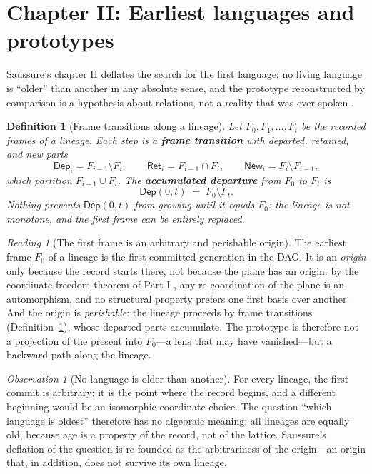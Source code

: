 \documentclass[11pt,a4paper]{article}
\newtheorem{definition}[principle]{Definition}
\theoremstyle{remark}
\newtheorem{observation}[principle]{Observation}
\newtheorem{reading}[principle]{Reading}
\newcommand{\Dep}{\ensuremath{\mathsf{Dep}}}             %
\newcommand{\Ret}{\ensuremath{\mathsf{Ret}}}             %
\newcommand{\New}{\ensuremath{\mathsf{New}}}             %
\begin{document}
\section{Chapter II: Earliest languages and prototypes}
\label{sec:ch2}

Saussure's chapter II deflates the search for the first language: no living
language is ``older'' than another in any absolute sense, and the prototype
reconstructed by comparison is a hypothesis about relations, not a reality
that was ever spoken \cite[Part V, ch.~II]{harris1983}.

\begin{definition}[Frame transitions along a lineage]
\label{def:frame-transition}
Let $F_0, F_1, \dots, F_t$ be the recorded frames of a lineage. Each step is
a \textbf{frame transition} with departed, retained, and new parts
\[
  \Dep_i = F_{i-1}\setminus F_i, \qquad
  \Ret_i = F_{i-1}\cap F_i, \qquad
  \New_i = F_i\setminus F_{i-1},
\]
which partition $F_{i-1}\cup F_i$. The \textbf{accumulated departure} from
$F_0$ to $F_t$ is
\[
  \Dep(0,t) \;=\; F_0 \setminus F_t .
\]
Nothing prevents $\Dep(0,t)$ from growing until it equals $F_0$: the
lineage is not monotone, and the first frame can be entirely replaced.
\end{definition}

\begin{reading}[The first frame is an arbitrary and perishable origin]
\label{read:origin}
The earliest frame $F_0$ of a lineage is the first committed generation in
the DAG. It is an \emph{origin} only because the record starts there, not
because the plane has an origin: by the coordinate-freedom theorem of Part I
\cite{part1}, any re-coordination of the plane is an automorphism, and no
structural property prefers one first basis over another. And the origin is
\emph{perishable}: the lineage proceeds by frame transitions
(Definition~\ref{def:frame-transition}), whose departed parts accumulate.
The prototype is therefore not a projection of the present into $F_0$---a
lens that may have vanished---but a backward path along the lineage.
\end{reading}

\begin{observation}[No language is older than another]
\label{obs:no-oldest}
For every lineage, the first commit is arbitrary: it is the point where the
record begins, and a different beginning would be an isomorphic coordinate
choice. The question ``which language is oldest'' therefore has no
algebraic meaning: all lineages are equally old, because age is a property
of the record, not of the lattice. Saussure's deflation of the question is
re-founded as the arbitrariness of the origin---an origin that, in
addition, does not survive its own lineage.
\end{observation}
\end{document}
